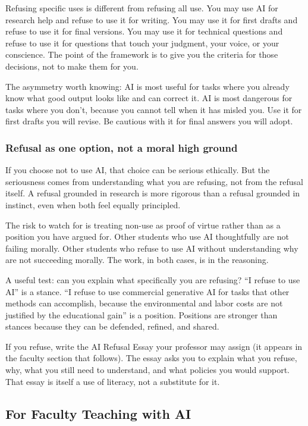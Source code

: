 \documentclass[12pt]{article}
\begin{document}
Refusing specific uses is different from refusing all use. You may use AI for research help and refuse to use it for writing. You may use it for first drafts and refuse to use it for final versions. You may use it for technical questions and refuse to use it for questions that touch your judgment, your voice, or your conscience. The point of the framework is to give you the criteria for those decisions, not to make them for you.

The asymmetry worth knowing: AI is most useful for tasks where you already know what good output looks like and can correct it. AI is most dangerous for tasks where you don't, because you cannot tell when it has misled you. Use it for first drafts you will revise. Be cautious with it for final answers you will adopt.

\subsubsection*{Refusal as one option, not a moral high ground}

If you choose not to use AI, that choice can be serious ethically. But the seriousness comes from understanding what you are refusing, not from the refusal itself. A refusal grounded in research is more rigorous than a refusal grounded in instinct, even when both feel equally principled.

The risk to watch for is treating non-use as proof of virtue rather than as a position you have argued for. Other students who use AI thoughtfully are not failing morally. Other students who refuse to use AI without understanding why are not succeeding morally. The work, in both cases, is in the reasoning.

A useful test: can you explain what specifically you are refusing? ``I refuse to use AI'' is a stance. ``I refuse to use commercial generative AI for tasks that other methods can accomplish, because the environmental and labor costs are not justified by the educational gain'' is a position. Positions are stronger than stances because they can be defended, refined, and shared.

If you refuse, write the AI Refusal Essay your professor may assign (it appears in the faculty section that follows). The essay asks you to explain what you refuse, why, what you still need to understand, and what policies you would support. That essay is itself a use of literacy, not a substitute for it.

\subsection{For Faculty Teaching with AI}
\label{sec:III.2}
\end{document}
